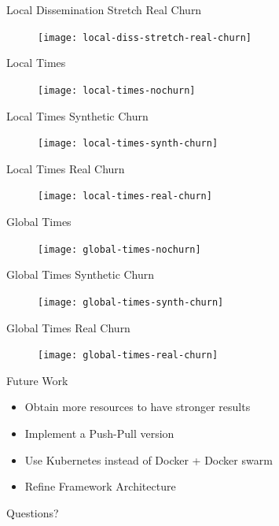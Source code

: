 \begin{frame}{Local Dissemination Stretch Real Churn}
	\begin{figure}
		\texttt{[image: local-diss-stretch-real-churn]}
	\end{figure}
\end{frame}

\begin{frame}{Local Times}
	\begin{figure}
		\texttt{[image: local-times-nochurn]}
	\end{figure}
\end{frame}

\begin{frame}{Local Times Synthetic Churn}
	\begin{figure}
		\texttt{[image: local-times-synth-churn]}
	\end{figure}
\end{frame}

\begin{frame}{Local Times Real Churn}
	\begin{figure}
		\texttt{[image: local-times-real-churn]}
	\end{figure}
\end{frame}

\begin{frame}{Global Times}
	\begin{figure}
		\texttt{[image: global-times-nochurn]}
	\end{figure}
\end{frame}

\begin{frame}{Global Times Synthetic Churn}
	\begin{figure}
		\texttt{[image: global-times-synth-churn]}
	\end{figure}
\end{frame}

\begin{frame}{Global Times Real Churn}
	\begin{figure}
		\texttt{[image: global-times-real-churn]}
	\end{figure}
\end{frame}

\subtitle[Conclusion]{Conclusion}

\begin{frame}{Future Work}
    \begin{itemize}
        \item Obtain more resources to have stronger results
        \item Implement a Push-Pull \epto{} version
        \item Use Kubernetes instead of Docker + Docker swarm
        \item Refine Framework Architecture
    \end{itemize}
\end{frame}

\begin{frame}[standout]
	Questions?
\end{frame}




